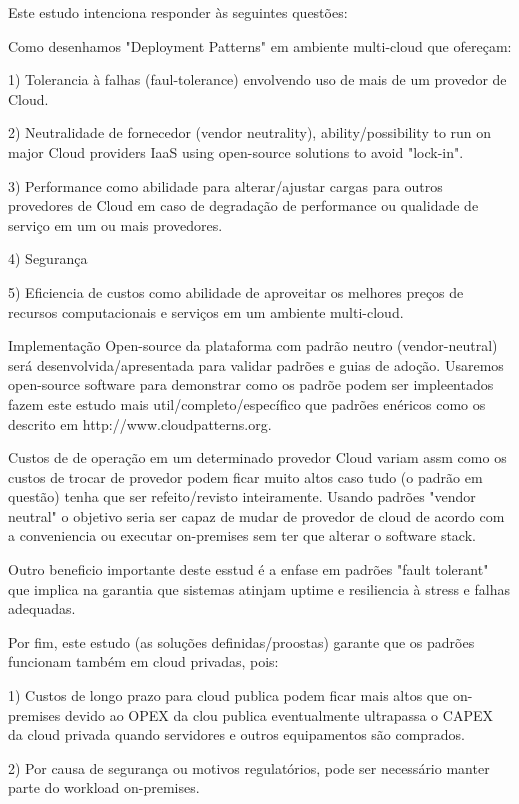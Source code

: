 \documentclass[12pt]{article}
\begin{document}
		Este estudo intenciona responder às seguintes questões:
		
		Como desenhamos "Deployment Patterns" em ambiente multi-cloud que ofereçam:
		
		1) Tolerancia à falhas (faul-tolerance) envolvendo uso de mais de um provedor de Cloud.
		
		2) Neutralidade de fornecedor (vendor neutrality), ability/possibility to run on major Cloud providers IaaS using open-source solutions to avoid "lock-in".
		
		3) Performance como abilidade para alterar/ajustar cargas para outros provedores de Cloud em caso de degradação de performance ou qualidade de serviço em um ou mais provedores.
		
		4) Segurança
		
		5) Eficiencia de custos como abilidade de aproveitar os melhores preços de recursos computacionais e serviços em um ambiente multi-cloud.
		
		Implementação Open-source da plataforma com padrão neutro (vendor-neutral) será desenvolvida/apresentada para validar padrões e guias de adoção. Usaremos open-source software para demonstrar como os padrõe podem ser impleentados fazem este estudo mais util/completo/específico que padrões enéricos como os descrito em http://www.cloudpatterns.org.
		
		Custos de de operação em um determinado provedor Cloud variam assm como os custos de trocar de provedor podem ficar muito altos caso tudo (o padrão em questão) tenha que ser refeito/revisto inteiramente. Usando padrões "vendor neutral" o objetivo seria ser capaz de mudar de provedor de cloud de acordo com a conveniencia ou executar on-premises sem ter que alterar o software stack.
		
		Outro beneficio importante deste esstud é a enfase em padrões "fault tolerant" que implica na garantia que sistemas atinjam uptime e resiliencia à stress e falhas adequadas. 
		
		Por fim, este estudo (as soluções definidas/proostas) garante que os padrões funcionam também em cloud privadas, pois:
		
		1) Custos de longo prazo para cloud publica podem ficar mais altos que on-premises devido ao OPEX da clou publica eventualmente ultrapassa o CAPEX da cloud privada quando servidores e outros equipamentos são comprados.
		
		2) Por causa de segurança ou motivos regulatórios, pode ser necessário manter parte do workload on-premises.
		
\end{document}
